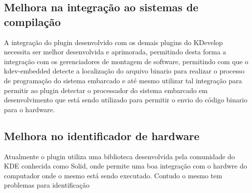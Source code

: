 \subsection{Melhora na integração ao sistemas de compilação}
A integração do plugin desenvolvido com os demais plugins do KDevelop necessita ser melhor desenvolvida e aprimorada, permitindo desta
forma a integração com os gerenciadores de montagem de software, permitindo com que o kdev-embedded detecte a localização do arquivo
binario para realizar o processo de programação do sistema embarcado e até mesmo utilizar tal integração para permitir ao plugin
detectar o processador do sistema embarcado em desenvolvimento que está sendo utilizado para permitir o envio do código binario para
o hardware.

\subsection{Melhora no identificador de hardware}
Atualmente o plugin utiliza uma biblioteca desenvolvida pela comunidade do KDE conhecida como Solid, onde permite uma boa integração
com o hardwre do computador onde o mesmo está sendo executado. Contudo o mesmo tem problemas para identificação

